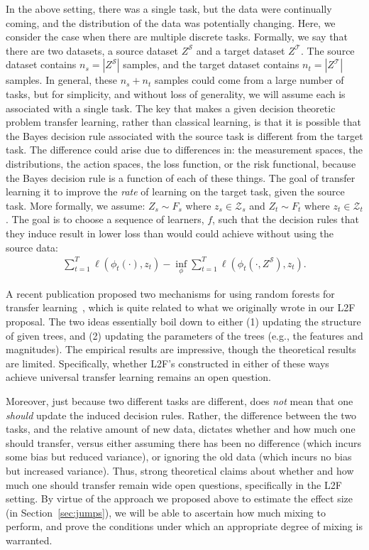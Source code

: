 \documentclass{article}
\begin{document}
In the above setting, there was a single task, but the data were continually coming, and the distribution of the data was potentially changing.  Here, we consider the case when there are multiple discrete tasks.  Formally, we say that there are two datasets, a source dataset $Z^\mathcal{S}$ and a target dataset $Z^\mathcal{T}$. The source dataset contains $n_s = | Z^\mathcal{S}|$ samples, and the target dataset contains $n_t = |Z^\mathcal{T}|$ samples. In general, these $n_s+n_t$ samples could come from a large number of tasks, but for simplicity, and without loss of generality, we will assume each is associated with a single task. The key that makes a given decision theoretic problem transfer learning, rather than classical learning, is that it is possible that the Bayes decision rule associated with the source task is different from the target task.  The difference could arise due to differences in: the measurement spaces, the distributions, the action spaces, the loss function, or the risk functional, because the Bayes decision rule is a function of each of these things.  The goal of transfer learning it to improve the \emph{rate} of learning on the target task, given the source task. More formally, we assume:
$Z_s \sim F_s$ where $z_s \in \mathcal{Z}_s$ and 
$Z_t \sim F_t$ where $z_t \in \mathcal{Z}_t$. 
The goal is to choose a sequence of learners, $f$, such that the decision rules that they induce result in lower loss than would could achieve without using the source data:
\begin{align}
    \sum_{t=1}^T \ell(\phi_t( \cdot), z_t)    - \inf_{\phi} \sum_{t=1}^T \ell(\phi_t( \cdot, Z^\mathcal{S}), z_t).
\end{align}

A recent publication proposed two mechanisms for using random forests for transfer learning~\cite{Segev2016}, which is quite related to what we originally wrote in our L2F proposal. The two ideas essentially boil down to either (1) updating the structure of given trees, and (2) updating the parameters of the trees (e.g., the features and magnitudes).  The empirical results are impressive, though the theoretical results are limited.  Specifically, whether L2F's constructed in either of these ways achieve universal transfer learning remains an open question.  

Moreover, just because two different tasks are different, does \emph{not} mean that one \emph{should} update the induced decision rules.  Rather, the difference between the two tasks, and the relative amount of new data, dictates whether and how much one should transfer, versus either assuming there has been no difference (which incurs some bias but reduced variance), or ignoring the old data (which incurs no bias but increased variance).  Thus, strong theoretical claims about whether and how much one should transfer remain wide open questions, specifically in the L2F setting.  By virtue of the approach we proposed above to estimate the effect size (in Section~\ref{sec:jumps}), we will be able to ascertain how much mixing to perform, and prove the conditions under which an appropriate degree of mixing is warranted. 
\end{document}
